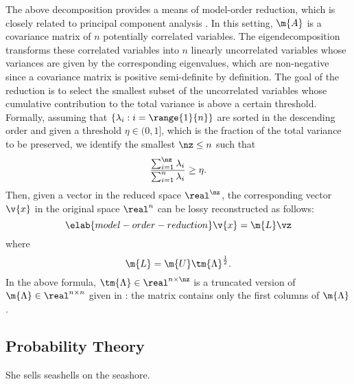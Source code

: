 The above decomposition provides a means of model-order reduction, which is
closely related to principal component analysis \cite{hastie2013}. In this
setting, $\m{A}$ is a covariance matrix of $n$ potentially correlated variables.
The eigendecomposition transforms these correlated variables into $n$ linearly
uncorrelated variables whose variances are given by the corresponding
eigenvalues, which are non-negative since a covariance matrix is positive
semi-definite by definition. The goal of the reduction is to select the smallest
subset of the uncorrelated variables whose cumulative contribution to the total
variance is above a certain threshold. Formally, assuming that $\{ \lambda_i: i
= \range{1}{n} \}$ are sorted in the descending order and given a threshold
$\eta \in (0, 1]$, which is the fraction of the total variance to be preserved,
we identify the smallest $\nz \leq n$ such that
\[
  \frac{\sum_{i = 1}^\nz \lambda_i}{\sum_{i = 1}^n \lambda_i} \geq \eta.
\]
Then, given a vector \vz in the reduced space $\real^\nz$, the corresponding
vector $\v{x}$ in the original space $\real^n$ can be lossy reconstructed as
follows:
\begin{equation} \elab{model-order-reduction}
  \v{x} = \m{L} \vz
\end{equation}
where
\[
  \m{L} = \m{U} \tm{\Lambda}^\frac{1}{2}.
\]
In the above formula, $\tm{\Lambda} \in \real^{n \times \nz}$ is a truncated
version of $\m{\Lambda} \in \real^{n \times n}$ given in
: the matrix contains only the first \nz columns of
$\m{\Lambda}$.

\subsection{Probability Theory}

She sells seashells on the seashore.

